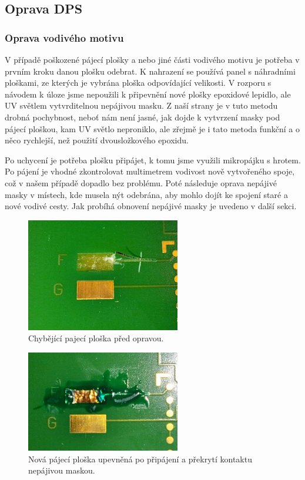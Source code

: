 \subsection{Oprava DPS}
    \subsubsection{Oprava vodivého motivu}
        V případě poškozené pájecí plošky a nebo jiné části vodivého motivu je potřeba v prvním kroku danou plošku odebrat. K nahrazení se používá panel s náhradními ploškami, ze kterých je vybrána ploška odpovídající velikosti. V rozporu s návodem k úloze \cite{zadani} jsme nepoužili k připevnění nové plošky epoxidové lepidlo, ale UV světlem vytvrditelnou nepájivou masku. Z naší strany je v tuto metodu drobná pochybnost, neboť nám není jasné, jak dojde k vytvrzení masky pod pájecí ploškou, kam UV světlo neproniklo, ale zřejmě je i tato metoda funkční a o něco rychlejší, než použití dvousložkového epoxidu.

        Po uchycení je potřeba plošku připájet, k tomu jsme využili mikropájku s hrotem. Po pájení je vhodné zkontrolovat multimetrem vodivost nově vytvořeného spoje, což v našem případě dopadlo bez problému. Poté následuje oprava nepájivé masky v místech, kde musela nýt odebrána, aby mohlo dojít ke spojení staré a nové vodivé cesty. Jak probíhá obnovení nepájivé masky je uvedeno v další sekci. 

        \begin{figure}[h!]
            \centering
            \includegraphics[width=0.6\textwidth]{img/ploska-pred.png}
            \caption{Chybějící pajecí ploška před opravou.}
            \label{fig:obr-ploska-pred-png}
        \end{figure}
        
        \begin{figure}[h!]
            \centering
            \includegraphics[width=0.6\textwidth]{img/ploska-po.png}
            \caption{Nová pájecí ploška upevněná po připájení a překrytí kontaktu nepájivou maskou.}
            \label{fig:obr-ploska-po-png}
        \end{figure}

